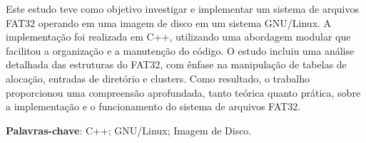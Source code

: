 \documentclass[
    12pt,				%
    oneside,   	        %
    a4paper,			%
    english,			%
    french,				%
    spanish,			%
    brazil,				%
    ]{pacotes/abntex2}
\begin{document}
\frenchspacing 



\imprimirfolhaderosto



\begin{resumo}

Este estudo teve como objetivo investigar e implementar um sistema de arquivos FAT32 operando em uma imagem de disco em um sistema GNU/Linux. A implementação foi realizada em C++, utilizando uma abordagem modular que facilitou a organização e a manutenção do código. O estudo incluiu uma análise detalhada das estruturas do FAT32, com ênfase na manipulação de tabelas de alocação, entradas de diretório e clusters. Como resultado, o trabalho proporcionou uma compreensão aprofundada, tanto teórica quanto prática, sobre a implementação e o funcionamento do sistema de arquivos FAT32.

 \vspace{\onelineskip}
    
 \noindent
 \textbf{Palavras-chave}: C++; GNU/Linux; Imagem de Disco.
 
\end{resumo}%




\tableofcontents*
\cleardoublepage

\textual
\end{document}
